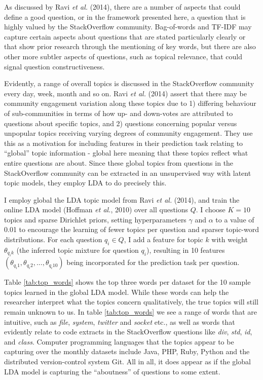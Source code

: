 \documentclass[11pt,preprint, authoryear]{article}
\begin{document}
As discussed by Ravi \emph{et al.} (2014), there are a number of aspects
that could define a good question, or in the framework presented here, a
question that is highly valued by the StackOverflow community.
Bag-of-words and TF-IDF may capture certain aspects about questions that
are stated particularly clearly or that show prior research through the
mentioning of key words, but there are also other more subtler aspects
of questions, such as topical relevance, that could signal question
constructiveness.

Evidently, a range of overall topics is discussed in the StackOverflow
community every day, week, month and so on. Ravi \emph{et al.} (2014)
assert that there may be community engagement variation along these
topics due to 1) differing behaviour of sub-communities in terms of how
up- and down-votes are attributed to questions about specific topics,
and 2) questions concerning popular versus unpopular topics receiving
varying degrees of community engagement. They use this as a motivation
for including features in their prediction task relating to ``global''
topic information - global here meaning that these topics reflect what
entire questions are about. Since these global topics from questions in
the StackOverflow community can be extracted in an unsupervised way with
latent topic models, they employ LDA to do precisely this.

I employ global the LDA topic model from Ravi \emph{et al.} (2014), and
train the online LDA model (Hoffman \emph{et al.}, 2010) over all
questions \(Q\). I choose \(K=10\) topics and sparse Dirichlet priors,
setting hyperparameters \(\gamma\) and \(\alpha\) to a value of 0.01 to
encourage the learning of fewer topics per question and sparser
topic-word distributions. For each question \(q_i \in Q\), I add a
feature for topic \(k\) with weight \(\theta_{q_ik}\) (the inferred
topic mixture for question \(q_i\)), resulting in 10 features
\((\theta_{q_i1}, \theta_{q_i2}, ..., \theta_{q_i{10}})\) being
incorporated for the prediction task per question.

Table \ref{tab:top_words} shows the top three words per dataset for the
10 sample topics learned in the global LDA model. While these words can
help the researcher interpret what the topics concern qualitatively, the
true topics will still remain unknown to us. In table
\ref{tab:top_words} we see a range of words that are intuitive, such as
\emph{file}, \emph{system}, \emph{twitter} and \emph{socket} etc., as
well as words that evidently relate to code extracts in the
StackOverflow questions like \emph{div}, \emph{std}, \emph{id}, and
\emph{class}. Computer programming languages that the topics appear to
be capturing over the monthly datasets include Java, PHP, Ruby, Python
and the distributed version-control system Git. All in all, it does
appear as if the global LDA model is capturing the ``aboutness'' of
questions to some extent.
\end{document}
